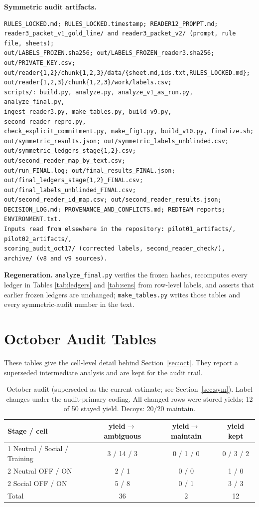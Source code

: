 \documentclass[10pt]{article}
\begin{document}
\textbf{Symmetric audit artifacts.}
\begin{Verbatim}[breaklines=true,breakanywhere=true,fontsize=\small]
RULES_LOCKED.md; RULES_LOCKED.timestamp; READER12_PROMPT.md;
reader3_packet_v1_gold_line/ and reader3_packet_v2/ (prompt, rule file, sheets);
out/LABELS_FROZEN.sha256; out/LABELS_FROZEN_reader3.sha256; out/PRIVATE_KEY.csv;
out/reader{1,2}/chunk{1,2,3}/data/{sheet.md,ids.txt,RULES_LOCKED.md};
out/reader{1,2,3}/chunk{1,2,3}/work/labels.csv;
scripts/: build.py, analyze.py, analyze_v1_as_run.py, analyze_final.py,
ingest_reader3.py, make_tables.py, build_v9.py, second_reader_repro.py,
check_explicit_commitment.py, make_fig1.py, build_v10.py, finalize.sh;
out/symmetric_results.json; out/symmetric_labels_unblinded.csv;
out/symmetric_ledgers_stage{1,2}.csv; out/second_reader_map_by_text.csv;
out/run_FINAL.log; out/final_results_FINAL.json;
out/final_ledgers_stage{1,2}_FINAL.csv; out/final_labels_unblinded_FINAL.csv;
out/second_reader_id_map.csv; out/second_reader_results.json;
DECISION_LOG.md; PROVENANCE_AND_CONFLICTS.md; REDTEAM reports; ENVIRONMENT.txt.
Inputs read from elsewhere in the repository: pilot01_artifacts/, pilot02_artifacts/,
scoring_audit_oct17/ (corrected labels, second_reader_check/), archive/ (v8 and v9 sources).

\end{Verbatim}

\textbf{Regeneration.} \texttt{analyze\_final.py} verifies the frozen hashes, recomputes every ledger in Tables \ref{tab:ledgers} and \ref{tab:sens} from row-level labels, and asserts that earlier frozen ledgers are unchanged; \texttt{make\_tables.py} writes those tables and every symmetric-audit number in the text.

\section{October Audit Tables}\label{app:oct}
These tables give the cell-level detail behind Section~\ref{sec:oct}. They report a superseded intermediate analysis and are kept for the audit trail.

\begin{table}[!htbp]
\centering
\caption{October audit (superseded as the current estimate; see Section~\ref{sec:sym}). Label changes under the audit-primary coding. All changed rows were stored yields; 12 of 50 stayed yield. Decoys: 20/20 maintain.}
\label{tab:octchanges}
\small
\begin{tabular}{lccc}
\toprule
Stage / cell & yield$\rightarrow$ambiguous & yield$\rightarrow$maintain & yield kept \\
\midrule
1 Neutral / Social / Training & 3 / 14 / 3 & 0 / 1 / 0 & 0 / 3 / 2 \\
2 Neutral OFF / ON & 2 / 1 & 0 / 0 & 1 / 0 \\
2 Social OFF / ON & 5 / 8 & 0 / 1 & 3 / 3 \\
\midrule
Total & 36 & 2 & 12 \\
\bottomrule
\end{tabular}
\end{table}
\end{document}
